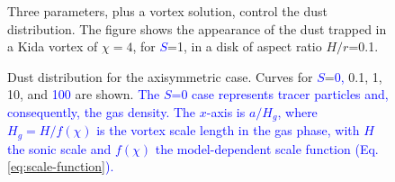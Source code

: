 \documentclass[apj]{emulateapj}
\def\blue#1{\textcolor{blue}{#1}}
\newcommand{\eqp}[1]{(Eq. \ref{#1})}
\begin{document}
\begin{figure}
\begin{center}
 \end{center}
\caption[]{Three parameters, plus a vortex solution, control the dust distribution. 
The figure shows the appearance of the dust trapped in a Kida vortex of $\chi=4$, 
for \blue{$S$}=1, in a disk of aspect ratio $H/r$=0.1.}
 \label{fig:disk}
\end{figure}

\begin{figure}
  \begin{center}
  \end{center}
\caption[]{Dust distribution for the axisymmetric case. Curves for
  \blue{$S$}=\blue{0,} 0.1, 1, 10, and \blue{100} are shown. \blue{The
  $S$=0 case represents tracer particles and, consequently, the gas
  density. The $x$-axis is $a/H_g$, where $H_g=H/f(\chi)$ is the
  vortex scale length in the gas phase, with $H$ the sonic scale and
  $f(\chi)$ the model-dependent scale function
  \eqp{eq:scale-function}.}}
 \label{fig:gaussian}
\end{figure}
\end{document}
